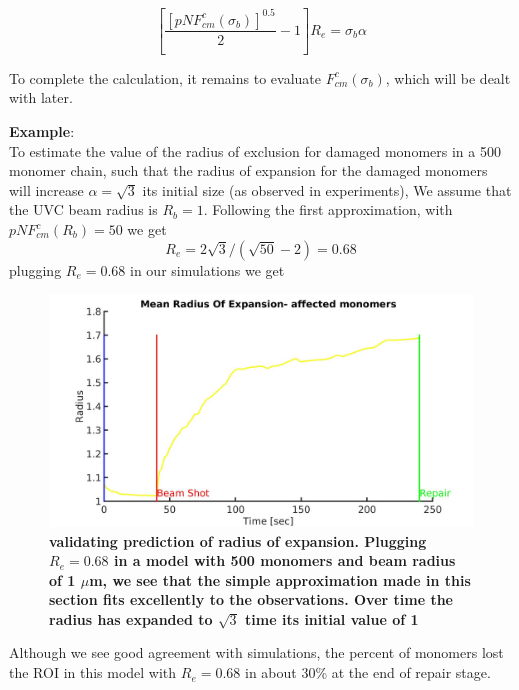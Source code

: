 \documentclass[12pt]{report}
\begin{document}
    \begin{equation*}
    \left[\frac{[pNF_{cm}^c(\sigma_b)]^{0.5}}{2}-1 \right]R_e = \sigma_b\alpha
    \end{equation*}
    
   To complete the calculation, it remains to evaluate $F_{cm}^c(\sigma_b)$, which will be dealt with later.
   
   \textbf{Example}:\\
   To estimate the value of the radius of exclusion for damaged monomers in a 500 monomer chain, such that the radius of expansion for the damaged monomers will increase $\alpha =\sqrt{3}$ its initial size (as observed in experiments), We assume that the UVC beam radius is $R_b=1$. Following the first approximation, with  $pNF_{cm}^c(R_b)=50$ we get 
   \begin{equation*}
   R_e =2\sqrt{3}/(\sqrt{50} -2) = 0.68
   \end{equation*}
   plugging $R_e=0.68$ in our simulations we get
   
	\begin{figure}[H]
	\includegraphics[width=0.5\linewidth, height=0.3\textheight]{Images/ExludeAroundDamagedMonomers/BreakDamagedCrosslinks/testExpansion/meanRadiusOfExpansionDamagedMonomers}
	\caption{\tiny{\textbf{validating prediction of radius of expansion. Plugging $R_e=0.68$ in a model with 500 monomers and beam radius of 1 $\mu$m, we see that the simple approximation made in this section fits excellently to the observations. Over time the radius has expanded to $\sqrt{3}$ time its initial value of 1}}}
	\label{fig:meanRadiusOfExpansionDamagedMonomers}
	\end{figure}
	 Although we see good agreement with simulations, the percent of monomers lost the ROI in this model with $R_e=0.68$ in about 30\% at the end of repair stage.
	 
\end{document}
